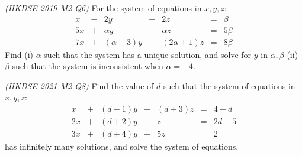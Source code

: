 \begin{exerciselist}
	\item \textit{ (HKDSE 2019 M2 Q6)} For the system of equations in $x,y,z$:\[
	\begin{array}{rrrrrrr}
		x&-&2y&-&2z&=&\beta\\
		5x&+&\alpha y&+&\alpha z&=&5\beta\\
		7x&+&(\alpha-3)y&+&(2\alpha+1)z&=&8\beta
	\end{array}
	\]
	Find (i) $\alpha$ such that the system has a unique solution, and solve for $y$ in $\alpha,\beta$ (ii) $\beta$ such that the system is inconsistent when $\alpha=-4$.
	\item \textit{ (HKDSE 2021 M2 Q8)} Find the value of $d$ such that the system of equations in $x,y,z$:\[
	\begin{array}{rrrrrrr}
		x&+&(d-1)y&+&(d+3)z&=&4-d\\
		2x&+&(d+2)y&-&z&=&2d-5\\
		3x&+&(d+4)y&+&5z&=&2
	\end{array}
	\]
	has infinitely many solutions, and solve the system of equations.
	
\end{exerciselist}

